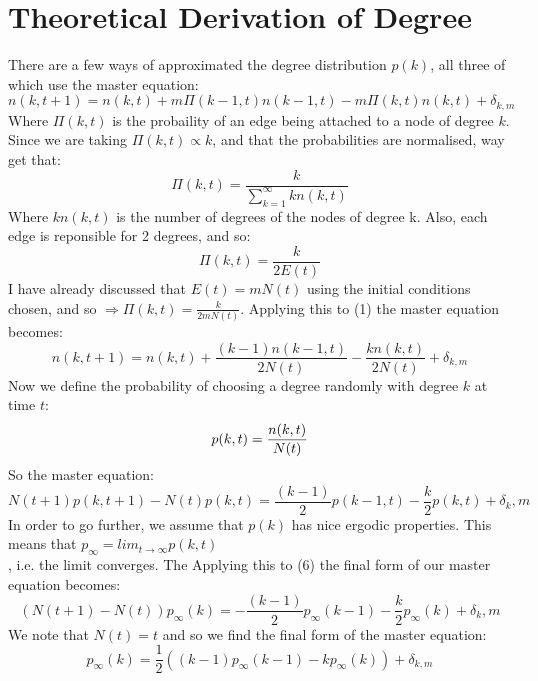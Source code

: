 \documentclass[]{article}
\begin{document}
\section{Theoretical Derivation of Degree}

There are a few ways of approximated the degree distribution $p(k)$, all three of which use the master equation: 
\begin{equation}
n(k,t+1)=n(k,t)+m\Pi(k-1,t)n(k-1,t)-m\Pi(k,t)n(k,t)+\delta_{k,m}
\end{equation}
Where $\Pi(k,t)$ is the probaility of an edge being attached to a node of degree $k$.
Since we are taking $\Pi(k,t) \propto k$, and that the probabilities are normalised, way get that:
\begin{equation}
\Pi(k,t)=\frac{k}{\sum_{k=1}^{\infty}{kn(k,t)}}
\end{equation}
Where $kn(k,t)$ is the number of degrees of the nodes of degree k. Also, each edge is reponsible for 2 degrees, and so:
\begin{equation}
\Pi(k,t)=\frac{k}{2E(t)}
\end{equation}
I have already discussed that $E(t)=mN(t)$ using the initial conditions chosen, and so $\Rightarrow \Pi(k,t)=\frac{k}{2mN(t)}$. Applying this to (1) the master equation becomes:
\begin{equation}
n(k,t+1)=n(k,t)+\frac{(k-1)n(k-1,t)}{2N(t)}-\frac{kn(k,t)}{2N(t)}+\delta_{k,m}
\end{equation}
Now we define the probability of choosing a degree randomly with degree $k$ at time $t$: 
\begin{equation}
p(k,t)=\frac{n(k,t)}{N(t)}\\
\end{equation}
So the master equation:
\begin{equation}
N(t+1)p(k,t+1)-N(t)p(k,t)=\frac{(k-1)}{2}p(k-1,t)-\frac{k}{2}p(k,t)+ \delta_k,m
\end{equation}
In order to go further, we assume that $p(k)$ has nice ergodic properties. This means that $p_{\infty}=lim_{t \rightarrow \infty} p(k,t)$\\, i.e. the limit converges. The Applying this to (6) the final form of our master equation becomes:
\begin{equation}
(N(t+1)-N(t))p_{\infty}(k)=-\frac{(k-1)}{2}p_{\infty}(k-1)-\frac{k}{2}p_{\infty}(k)+ \delta_k,m
\end{equation}
We note that $N(t)=t$  and so we find the final form of the master equation:
\begin{equation}
p_{\infty}(k)=\frac{1}{2}((k-1)p_{\infty}(k-1)-kp_{\infty}(k)) +\delta_{k,m}
\end{equation}
\end{document}

